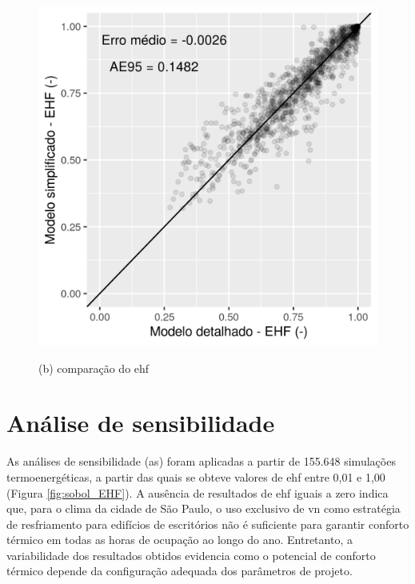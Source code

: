 \documentclass[brazil,hardcopy,openany]{ufscthesis} %
\begin{document}
\begin{figure}[h]
	\begin{minipage}{.5\textwidth}
		\centering
		\includegraphics[width=1\linewidth]{img/cpeq_COM_80EHF.png}
		\begin{center}
			\small{(b) comparação do \acrshort{ehf}}
		\end{center}
	\end{minipage}
	\label{fig:crack08}
\end{figure}

\newpage

\section{Análise de sensibilidade}

As análises de sensibilidade (\acrshort{as}) foram aplicadas a partir de 155.648 simulações termoenergéticas, a partir das quais se obteve valores de \acrshort{ehf} entre 0,01 e 1,00 (Figura \ref{fig:sobol_EHF}).
A ausência de resultados de \acrshort{ehf} iguais a zero indica que, para o clima da cidade de São Paulo, o uso exclusivo de \acrshort{vn} como estratégia de resfriamento para edifícios de escritórios não é suficiente para garantir conforto térmico em todas as horas de ocupação ao longo do ano. Entretanto, a variabilidade dos resultados obtidos evidencia como o potencial de conforto térmico depende da configuração adequada dos parâmetros de projeto.
\end{document}
